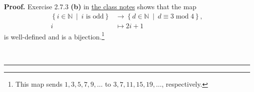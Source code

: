 \documentclass[paper=a4, fontsize=12pt]{scrartcl}%
\theoremstyle{plainsl}
\theoremstyle{definition}
\theoremstyle{remark}
\newenvironment{proof}[1][Proof]{\noindent\textbf{#1.} }{\ \rule{0.5em}{0.5em}}
\begin{document}
\begin{proof}
Exercise 2.7.3 \textbf{(b)} in
\href{http://www.cip.ifi.lmu.de/~grinberg/t/19s/notes.pdf}{the class notes}
shows that the map%
\begin{align*}
\left\{  i\in\mathbb{N}\ \mid\ i\text{ is odd}\right\}   &  \rightarrow
\left\{  d\in\mathbb{N}\ \mid\ d\equiv3\operatorname{mod}4\right\}  ,\\
i  &  \mapsto2i+1
\end{align*}
is well-defined and is a bijection.\footnote{This map sends $1,3,5,7,9,\ldots$
to $3,7,11,15,19,\ldots$, respectively.}

\end{proof}
\end{document}
